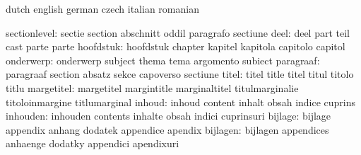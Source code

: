 \stopvariables




\startvariables            dutch                     english
                           german                    czech
                           italian                   romanian

             sectionlevel: sectie                    section
                           abschnitt                 oddil
                           paragrafo                 sectiune
                     deel: deel                      part
                           teil                      cast
                           parte                     parte
                hoofdstuk: hoofdstuk                 chapter
                           kapitel                   kapitola
                           capitolo                  capitol
                onderwerp: onderwerp                 subject
                           thema                     tema
                           argomento                 subiect
                paragraaf: paragraaf                 section
                           absatz                    sekce
                           capoverso                 sectiune
                    titel: titel                     title
                           titel                     titul
                           titolo                    titlu
               margetitel: margetitel                margintitle
                           marginaltitel             titulmarginalie
                           titoloinmargine           titlumarginal
                   inhoud: inhoud                    content
                           inhalt                    obsah
                           indice                    cuprins
                 inhouden: inhouden                  contents
                           inhalte                   obsah
                           indici                    cuprinsuri
                  bijlage: bijlage                   appendix
                           anhang                    dodatek
                           appendice                 apendix
                 bijlagen: bijlagen                  appendices
                           anhaenge                  dodatky
                           appendici                 apendixuri
